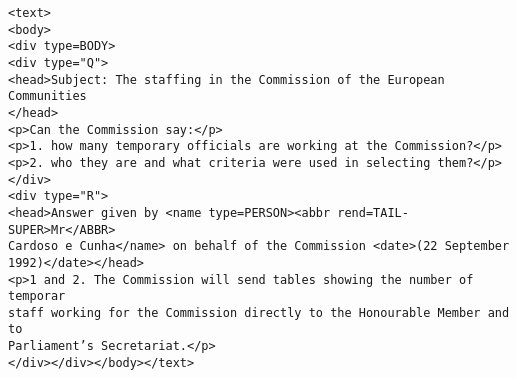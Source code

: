 \documentclass[a4paper,landscape,headrule,footrule,xetex]{foils}
\begin{document}

\begin{verbatim}
<text>
<body>
<div type=BODY>
<div type="Q">
<head>Subject: The staffing in the Commission of the European Communities
</head>
<p>Can the Commission say:</p>
<p>1. how many temporary officials are working at the Commission?</p>
<p>2. who they are and what criteria were used in selecting them?</p>
</div>
<div type="R">
<head>Answer given by <name type=PERSON><abbr rend=TAIL-SUPER>Mr</ABBR>
Cardoso e Cunha</name> on behalf of the Commission <date>(22 September
1992)</date></head>
<p>1 and 2. The Commission will send tables showing the number of temporar
staff working for the Commission directly to the Honourable Member and to
Parliament’s Secretariat.</p>
</div></div></body></text>
\end{verbatim}








\end{document}
